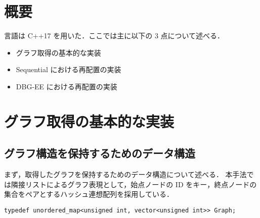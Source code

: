 \section{概要}
言語は C++17 を用いた．ここでは主に以下の 3 点について述べる．
\begin{itemize}
  \item グラフ取得の基本的な実装
  \item Sequential における再配置の実装
  \item DBG-EE における再配置の実装 
\end{itemize}
\section{グラフ取得の基本的な実装}
\subsection{グラフ構造を保持するためのデータ構造}
\label{graph_data}
まず，取得したグラフを保持するためのデータ構造について述べる．
本手法では隣接リストによるグラフ表現として，始点ノードの ID をキー，終点ノードの集合をペアとするハッシュ連想配列を採用している．
\begin{lstlisting}[caption=グラフ構造, label=data_structure]
  typedef unordered_map<unsigned int, vector<unsigned int>> Graph; 
\end{lstlisting}

